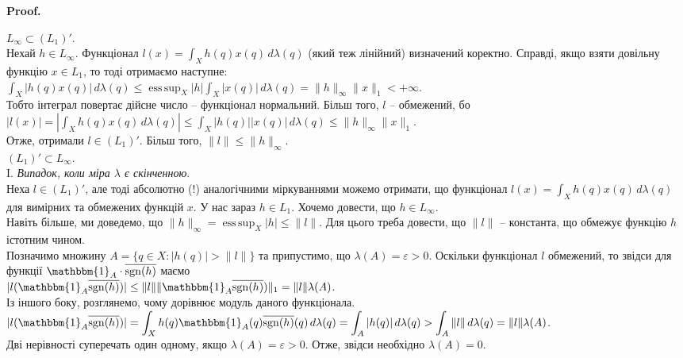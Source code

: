 \documentclass[a4paper, 10pt]{article}
\makeatletter
\theoremstyle{theoremdd}
\DeclareMathOperator{\sgn}{sgn}
\DeclareMathOperator*{\esssup}{ess\,sup}
\renewenvironment{proof}[1][Proof.\\]{\par
\pushQED{\hfill \qed}%
\normalfont \topsep6\p@\@plus6\p@\relax
\trivlist
\item\relax
{\bfseries
#1\@addpunct{.}}\hspace\labelsep\ignorespaces
}{%
\popQED\endtrivlist\@endpefalse
}
\makeatother
\begin{document}
\begin{proof}
$L_\infty \subset (L_1)'$.\\
Нехай $h \in L_\infty$. Функціонал $l(x) = \displaystyle\int_X h(q)x(q)\,d\lambda(q)$ (який теж лінійний) визначений коректно. Справді, якщо взяти довільну функцію $x \in L_1$, то тоді отримаємо наступне:\\
$\displaystyle\int_X |h(q) x(q)|\,d\lambda(q) \leq \esssup_X |h| \int_X |x(q)|\,d\lambda(q) = \|h\|_\infty \|x\|_1 < +\infty$.\\
Тобто інтеграл повертає дійсне число -- функціонал нормальний. Більш того, $l$ -- обмежений, бо\\
$|l(x)| = \displaystyle\left| \int_X h(q) x(q)\,d\lambda(q) \right| \leq \int_X |h(q)| |x(q)|\,d\lambda(q) \leq \|h\|_\infty \|x\|_1$.\\
Отже, отримали $l \in (L_1)'$. Більш того, $\|l\| \leq \|h\|_\infty$.
\bigskip \\
$(L_1)' \subset L_\infty$.\\
I. \textit{Випадок, коли міра $\lambda$ є скінченною}.\\
Неха $l \in (L_1)'$, але тоді абсолютно (!) аналогічними міркуваннями можемо отримати, що функціонал $l(x) = \displaystyle\int_X h(q)x(q)\,d\lambda(q)$ для вимірних та обмежених функцій $x$. У нас зараз $h \in L_1$. Хочемо довести, що $h \in L_\infty$.\\
Навіть більше, ми доведемо, що $\|h\|_\infty =\displaystyle  \esssup_{X} |h| \leq \|l\|$. Для цього треба довести, що $\|l\|$ -- константа, що обмежує функцію $h$ істотним чином.\\
Позначимо множину $A = \{q \in X: |h(q)| > \|l\|\}$ та припустимо, що $\lambda(A) = \varepsilon > 0$. Оскільки функціонал $l$ обмежений, то звідси для функції $\mathbbm{1}_A \cdot \overline{\sgn (h)}$ маємо \\
$|l(\mathbbm{1}_A \overline{\sgn(h)})| \leq \|l\| \| \mathbbm{1}_A \overline{\sgn(h)})\|_1 = \|l\| \lambda(A)$.\\
Із іншого боку, розглянемо, чому дорівнює модуль даного функціонала.\\
$|l(\mathbbm{1}_A \overline{\sgn(h)})| = \displaystyle\int_X h(q) \mathbbm{1}_A(q) \overline{\sgn(h)}(q)\,d\lambda(q) = \int_A |h(q)|\,d\lambda(q) > \int_A \|l\|\,d\lambda(q) = \|l\| \lambda(A)$.\\
Дві нерівності суперечать один одному, якщо $\lambda(A) = \varepsilon > 0$. Отже, звідси необхідно $\lambda(A) = 0$.
\end{proof}
\newpage
\end{document}
